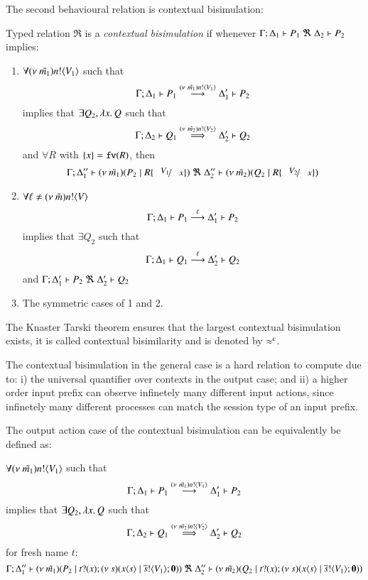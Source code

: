 The second behavioural relation is contextual bisimulation:
%
\begin{definition}\rm
	Typed relation 
	$\Re$ is a {\em contextual bisimulation} if whenever
	$\horel{\Gamma}{\Delta_1}{P_1}{\ \Re\ }{\Delta_2}{P_2}$ implies:
	\begin{enumerate}
		\item	$\forall (\nu\ \tilde{m_1}) n ! \langle V_1 \rangle$ such that
			\[
				\Gamma; \Delta_1 \vdash P_1 \stackrel{(\nu\ \tilde{m_1}) n ! \langle V_1 \rangle}{\longrightarrow} \Delta_1' \vdash P_2
			\]
			implies that $\exists Q_2, \lambda x.\,Q$ such that
			\[
				\Gamma; \Delta_2 \vdash Q_1 \stackrel{(\nu\ \tilde{m_2}) n ! \langle V_2 \rangle}{\Longrightarrow} \Delta_2' \vdash Q_2
			\]
			and $\forall R$ with $\{x\} = \mathtt{fv}(R)$, 
			then
			\[
				\horel{\Gamma}{\Delta_1''}{\newsp{\tilde{m_1}}{P_2 \Par R\subst{V_1}{x}}}
				{\ \Re\ }
				{\Delta_2''}{\newsp{\tilde{m_2}}{Q_2 \Par R\subst{V_2}{x}}}
			\]
%
		\item	$\forall \ell \not= (\nu\ \tilde{m}) n ! \langle V \rangle$
			\[
				\Gamma; \Delta_1 \vdash P_1 \stackrel{\ell}{\longrightarrow} \Delta_1' \vdash P_2
			\]
			implies that $\exists Q_2$ such that
			\[
				\Gamma; \Delta_1 \vdash Q_1 \stackrel{\ell}{\longrightarrow} \Delta_2' \vdash Q_2
			\]
			and
			$\horel{\Gamma}{\Delta_1'}{P_2}{\ \Re\ }{\Delta_2'}{Q_2}$

		\item	The symmetric cases of 1 and 2.
	\end{enumerate}
%
	The Knaster Tarski theorem ensures that the largest contextual bisimulation exists,
	it is called contextual bisimilarity and is denoted by $\approx^{c}$.
\end{definition}

The contextual bisimulation in the general case
is a hard relation to compute due to: i) the universal
quantifier over contexts in the output case;
and ii) a higher order input prefix can observe
infinetely many different input actions, since
infinetely many different processes can match
the session type of an input prefix.


The output action case of the contextual bisimulation
can be equivalently be defined as:

$\forall (\nu\ \tilde{m_1}) n ! \langle V_1 \rangle$ such that
%
\[
	\Gamma; \Delta_1 \vdash P_1 \stackrel{(\nu\ \tilde{m_1}) n ! \langle V_1 \rangle}{\longrightarrow} \Delta_1' \vdash P_2
\]
%
\noi implies that $\exists Q_2, \lambda x.\,Q$ such that
%
\[
	\Gamma; \Delta_2 \vdash Q_1 \stackrel{(\nu\ \tilde{m_2}) n ! \langle V_2 \rangle}{\Longrightarrow} \Delta_2' \vdash Q_2
\]
%
for fresh name $t$: %
%
\[
	\Gamma; \Delta_1'' \vdash (\nu\ \tilde{m_1})(P_2 \;|\; t ? (x) ; (\nu\ s)(x\langle s \rangle \;|\; \overline{s} ! \langle V_1 \rangle ; \mathbf{0})) \ \Re\  \Delta_2'' \vdash (\nu\ \tilde{m_2})(Q_2 \;|\; t ? (x) ; (\nu\ s)(x\langle s \rangle \;|\; \overline{s} ! \langle V_1 \rangle ; \mathbf{0}))
\]

